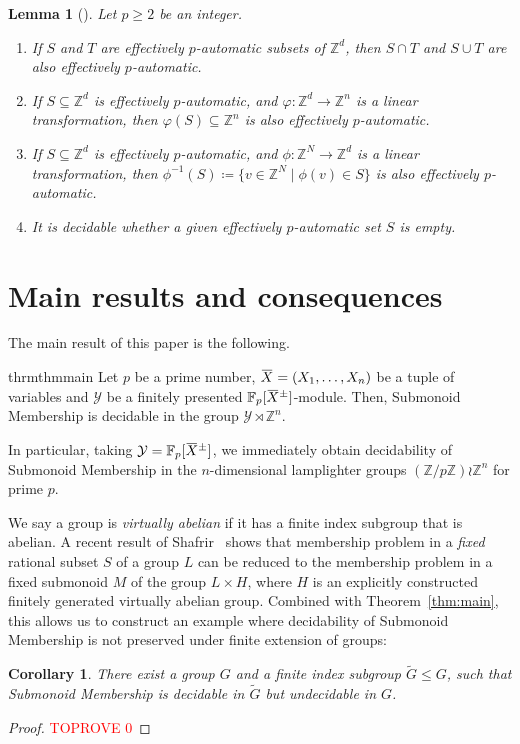 \documentclass[a4paper,UKenglish,cleveref, autoref, thm-restate]{lipics-v2021}
\newcommand{\Z}{\mathbb{Z}}
\newcommand{\F}{\mathbb{F}}
\newcommand{\mY}{\mathcal{Y}}
\newcommand{\oX}{\mkern 1.5mu\overline{\mkern-1.5mu X \mkern-1.5mu}\mkern 1.5mu}
\newtheorem{lem}[thrm]{Lemma}
\newtheorem{cor}[thrm]{Corollary}
\theoremstyle{definition}
\theoremstyle{definition}
\theoremstyle{definition}
\begin{document}
\begin{lem}[{\cite{wolper2000construction}}]\label{lem:pauto}
    Let $p \geq 2$ be an integer.
    \begin{enumerate}[(1)]
        \item If $S$ and $T$ are effectively $p$-automatic subsets of $\Z^d$, then $S \cap T$ and $S \cup T$ are also effectively $p$-automatic.
        \item If $S \subseteq \Z^d$ is effectively $p$-automatic, and $\varphi \colon \Z^d \rightarrow \Z^n$ is a linear transformation, then $\varphi(S) \subseteq \Z^n$ is also effectively $p$-automatic.
        \item If $S \subseteq \Z^d$ is effectively $p$-automatic, and $\phi \colon \Z^N \rightarrow \Z^d$ is a linear transformation, then $\phi^{-1}(S) \coloneqq \{v \in \Z^N \mid \phi(v) \in S\}$ is also effectively $p$-automatic.
        \item It is decidable whether a given effectively $p$-automatic set $S$ is empty.
    \end{enumerate}
\end{lem}

\section{Main results and consequences}\label{sec:mainres}

The main result of this paper is the following.

\begin{restatable}{thrm}{thmmain}\label{thm:main}
    Let $p$ be a prime number, $\oX = (X_1, \ldots, X_n)$ be a tuple of variables and $\mY$ be a finitely presented $\F_p[\oX^{\pm}]$-module.
    Then, Submonoid Membership is decidable in the group $\mY \rtimes \Z^n$.
\end{restatable}

In particular, taking $\mY = \F_p[\oX^{\pm}]$, we immediately obtain decidability of Submonoid Membership in the $n$-dimensional lamplighter groups $(\Z/p\Z) \wr \Z^n$ for prime $p$. 


We say a group is \emph{virtually abelian} if it has a finite index subgroup that is abelian.
A recent result of Shafrir~\cite[Theorem~8.1]{shafrir2024decidability} shows that membership problem in a \emph{fixed} rational subset $S$ of a group $L$ can be reduced to the membership problem in a fixed submonoid $M$ of the group $L \times H$, where $H$ is an explicitly constructed finitely generated virtually abelian group.
Combined with Theorem~\ref{thm:main}, this allows us to construct an example where decidability of Submonoid Membership is not preserved under finite extension of groups:
\begin{cor}\label{cor:finext}
    There exist a group $G$ and a finite index subgroup $\widetilde{G} \leq G$, such that Submonoid Membership is decidable in $\widetilde{G}$ but undecidable in $G$.
\end{cor}
\begin{proof}\textcolor{red}{TOPROVE 0}\end{proof}
\end{document}
